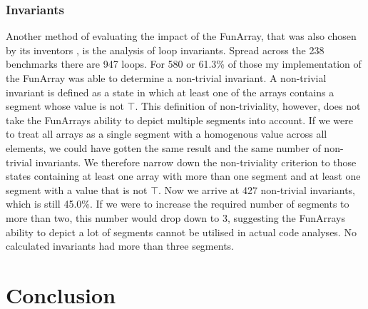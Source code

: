 \documentclass{report}
\begin{document}
\subsection{Invariants}
Another method of evaluating the impact of the FunArray, that was also chosen by its inventors \cite{cousot2011}, is the analysis of loop invariants. Spread across the 238 benchmarks there are 947 loops. For 580 or 61.3\% of those my implementation of the FunArray was able to determine a non-trivial invariant. A non-trivial invariant is defined as a state in which at least one of the arrays contains a segment whose value is not $\top$.
This definition of non-triviality, however, does not take the FunArrays ability to depict multiple segments into account. If we were to treat all arrays as a single segment with a homogenous value across all elements, we could have gotten the same result and the same number of non-trivial invariants. We therefore narrow down the non-triviality criterion to those states containing at least one array with more than one segment and at least one segment with a value that is not $\top$. Now we arrive at 427 non-trivial invariants, which is still 45.0\%. 
If we were to increase the required number of segments to more than two, this number would drop down to 3, suggesting the FunArrays ability to depict a lot of segments cannot be utilised in actual code analyses. No calculated invariants had more than three segments.


\chapter{Conclusion}



\newpage


\end{document}
